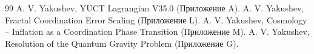 \documentclass[12pt,a4paper]{article}
\begin{document}
	\begin{thebibliography}{99}
		 A. V. Yakushev, YUCT Lagrangian V35.0 (Приложение A).
		 A. V. Yakushev, Fractal Coordination Error Scaling (Приложение L).
		 A. V. Yakushev, Cosmology -- Inflation as a Coordination Phase Transition (Приложение M).
		 A. V. Yakushev, Resolution of the Quantum Gravity Problem (Приложение G).
	\end{thebibliography}
	
\end{document}
